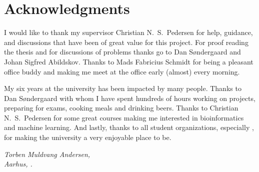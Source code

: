 \chapter{Acknowledgments}

I would like to thank my supervisor Christian N.\ S.\ Pedersen for help,
guidance, and discussions that have been of great value for this project. For
proof reading the thesis and for discussions of problems thanks go to Dan
Søndergaard and Johan Sigfred Abildskov. Thanks to Mads Fabricius Schmidt for
being a pleasant office buddy and making me meet at the office early (almost)
every morning.

My six years at the university has been impacted by many people. Thanks to Dan
Søndergaard with whom I have spent hundreds of hours working on projects,
preparing for exams, cooking meals and drinking beers. Thanks to Christian N.\
S.\ Pedersen for some great courses making me interested in bioinformatics and
machine learning. And lastly, thanks to all student organizations, especially
\TKET{}, for making the university a very enjoyable place to be.

\vspace{2ex}
\begin{flushright}
  \emph{Torben Muldvang Andersen,}\\
  \emph{Aarhus, .}
\end{flushright}

